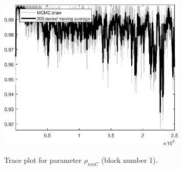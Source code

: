 \begin{figure}[H]
\centering
  \includegraphics[width=0.8\textwidth]{BRS_aggregate/graphs/TracePlot_rho_muC_blck_1}\\
    \caption{Trace plot for parameter ${\rho_{muC}}$ (block number 1).}
\end{figure}

